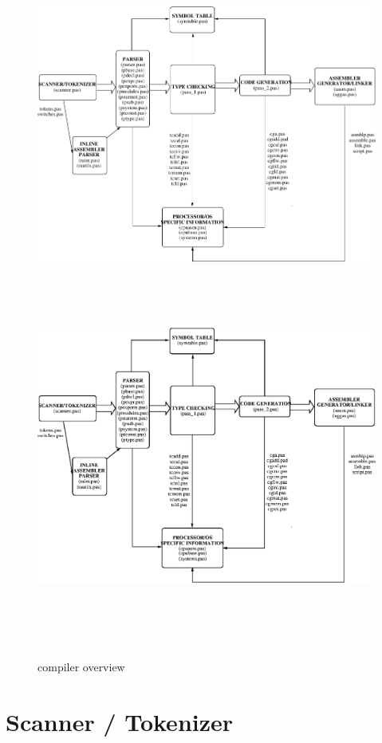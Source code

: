 \documentclass [a4paper,12pt]{article}
\begin{document}
\begin{figure}
\ifpdf
 \includegraphics{arch1.pdf}
\else
\includegraphics[width=6.45in,height=4.95in]{arch1.eps}
\fi
\caption{compiler overview}
\label{passesfig}
\end{figure}

\section{Scanner / Tokenizer}
\end{document}
